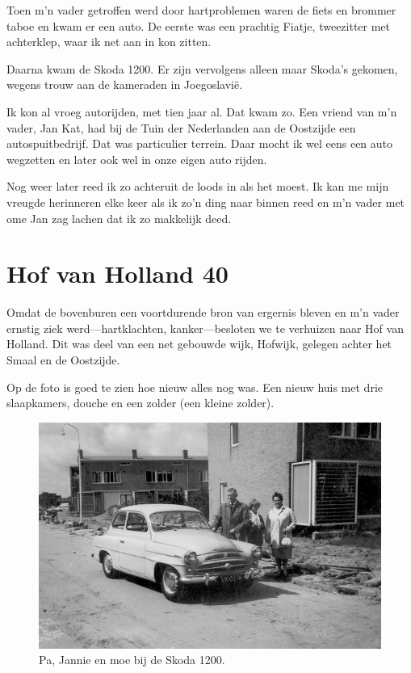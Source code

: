 \documentclass[10pt,twoside, openright]{memoir}
\begin{document}
Toen m'n vader getroffen werd door hartproblemen waren de fiets en brommer taboe en kwam er een auto. De eerste was een prachtig Fiatje, tweezitter met achterklep, waar ik net aan in kon zitten. 

Daarna kwam de Skoda 1200. Er zijn vervolgens alleen maar Skoda's gekomen, wegens trouw aan de kameraden in Joegoslavië. 

Ik kon al vroeg autorijden, met tien jaar al. Dat kwam zo. Een vriend van m'n vader, Jan Kat, had bij de Tuin der Nederlanden aan de Oostzijde een autospuitbedrijf. Dat was particulier terrein. Daar mocht ik wel eens een auto wegzetten en later ook wel in onze eigen auto rijden. 

Nog weer later reed ik zo achteruit de loods in als het moest. Ik kan me mijn vreugde herinneren elke keer als ik zo'n ding naar binnen reed en m'n vader met ome Jan zag lachen dat ik zo makkelijk deed.

\chapter{Hof van Holland 40} %
\label{cha:hofvanholland}

Omdat de bovenburen een voortdurende bron van ergernis bleven en m’n vader ernstig ziek werd---hartklachten, kanker---besloten we te verhuizen naar Hof van Holland. Dit was deel van een net gebouwde wijk, Hofwijk, gelegen achter het Smaal en de Oostzijde. 

Op de foto is goed te zien hoe nieuw alles nog was. Een nieuw huis met drie slaapkamers, douche en een zolder (een kleine zolder). 

\begin{figure}
\includegraphics[width=\textwidth]{img/ch21/skoda}
\caption*{\footnotesize Pa, Jannie en moe bij de Skoda 1200.}
\end{figure}
\end{document}
